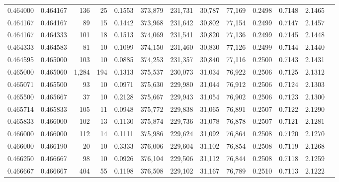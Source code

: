 \begin{tabular}{rrrrrrrrrrrrr}
0.464000 & 0.464167 &   136 &  25 &                                     0.1553 & 373,879 & 231,731 &  30,787 &  77,169 & 0.2498 & 0.7148 & 2.1465 \\
0.464167 & 0.464167 &    89 &  15 &                                     0.1442 & 373,968 & 231,642 &  30,802 &  77,154 & 0.2499 & 0.7147 & 2.1457 \\
0.464167 & 0.464333 &   101 &  18 &                                     0.1513 & 374,069 & 231,541 &  30,820 &  77,136 & 0.2499 & 0.7145 & 2.1448 \\
0.464333 & 0.464583 &    81 &  10 &                                     0.1099 & 374,150 & 231,460 &  30,830 &  77,126 & 0.2499 & 0.7144 & 2.1440 \\
0.464595 & 0.465000 &   103 &  10 &                                     0.0885 & 374,253 & 231,357 &  30,840 &  77,116 & 0.2500 & 0.7143 & 2.1431 \\
0.465000 & 0.465060 & 1,284 & 194 &                                     0.1313 & 375,537 & 230,073 &  31,034 &  76,922 & 0.2506 & 0.7125 & 2.1312 \\
0.465071 & 0.465500 &    93 &  10 &                                     0.0971 & 375,630 & 229,980 &  31,044 &  76,912 & 0.2506 & 0.7124 & 2.1303 \\
0.465500 & 0.465667 &    37 &  10 &                                     0.2128 & 375,667 & 229,943 &  31,054 &  76,902 & 0.2506 & 0.7123 & 2.1300 \\
0.465714 & 0.465833 &   105 &  11 &                                     0.0948 & 375,772 & 229,838 &  31,065 &  76,891 & 0.2507 & 0.7122 & 2.1290 \\
0.465833 & 0.466000 &   102 &  13 &                                     0.1130 & 375,874 & 229,736 &  31,078 &  76,878 & 0.2507 & 0.7121 & 2.1281 \\
0.466000 & 0.466000 &   112 &  14 &                                     0.1111 & 375,986 & 229,624 &  31,092 &  76,864 & 0.2508 & 0.7120 & 2.1270 \\
0.466000 & 0.466190 &    20 &  10 &                                     0.3333 & 376,006 & 229,604 &  31,102 &  76,854 & 0.2508 & 0.7119 & 2.1268 \\
0.466250 & 0.466667 &    98 &  10 &                                     0.0926 & 376,104 & 229,506 &  31,112 &  76,844 & 0.2508 & 0.7118 & 2.1259 \\
0.466667 & 0.466667 &   404 &  55 &                                     0.1198 & 376,508 & 229,102 &  31,167 &  76,789 & 0.2510 & 0.7113 & 2.1222 \\

\end{tabular}
